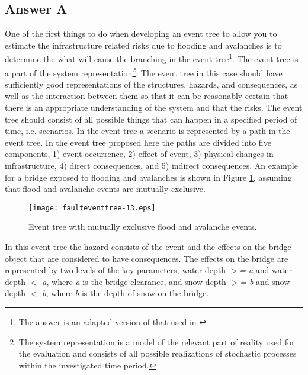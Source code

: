 \subsection{Answer A}
One of the first things to do when developing an event tree to allow you to
estimate the infrastructure related risks due to flooding and avalanches is to
determine the what will cause the branching in the event tree\footnote{The answer
is an adapted version of that used in \cite{Adey2009}}. The event tree is a part of the system
representation\footnote{The system representation is a model of the relevant part
of reality used for the evaluation and consists of all possible realizations of
stochastic processes within the investigated time period.}. The event tree in
this case should have sufficiently good representations of the structures,
hazards, and consequences, as well as the interaction between them so that it can
be reasonably certain that there is an appropriate understanding of the system
and that the risks. The event tree should consist of all possible things that can
happen in a specified period of time, i.e. scenarios. In the event tree a
scenario is represented by a path in the event tree. In the event tree proposed
here the paths are divided into five components, 1) event occurrence, 2) effect
of event, 3) physical changes in infrastructure, 4) direct consequences, and 5)
indirect consequences. An example for a bridge exposed to flooding and avalanches
is shown in Figure \ref{figeventfault:3}, assuming that flood and avalanche events are
mutually exclusive.
\begin{figure}[h]
\begin{center}
\texttt{[image: faulteventtree-13.eps]}
\caption{Event tree with mutually exclusive flood and avalanche
events.}\label{figeventfault:3}
\end{center}
\end{figure}
In this event tree the hazard consists of the event and the effects on the
bridge object that are considered to have consequences. The effects on the bridge
are represented by two levels of the key parameters, water depth \textit{$>$= a
}and water depth \textit{$<$ a}, where \textit{a }is the bridge clearance, and
snow depth \textit{$>$= b }and snow depth \textit{$<$ b}, where \textit{b }is the
depth of snow on the bridge.

